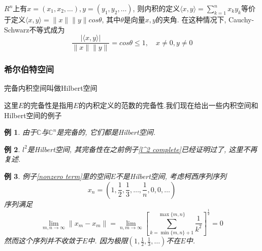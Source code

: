 \documentclass[a4paper,11pt]{article}
\theoremstyle{mystyle}
\newtheorem{example}{\hspace{2em}例}[section]
\begin{document}
$R^n$上有$x=(x_1,x_2,\dots),y=(y_1,y_2,\dots)$, 则内积的定义$\langle x,y\rangle=\sum_{k=1}^{n}x_ky_k$等价于定义$\langle x,y\rangle=\|x\|\|y\|cos\theta$, 其中$\theta$是向量$x,y$的夹角. 在这种情况下, Cauchy-Schwarz不等式成为
\begin{equation*}
  \frac{|\langle x,y\rangle|}{\|x\|\|y\|}=cos\theta\leq 1,\quad x\neq0,y\neq0
\end{equation*}
\subsubsection*{希尔伯特空间}
\begin{definition}
  完备内积空间叫做Hilbert空间
\end{definition}
这里$E$的完备性是指用$E$的内积定义的范数的完备性.我们现在给出一些内积空间和Hilbert空间的例子
\begin{example}
  由于$\mathbb{C}$与$\mathbb{C}^n$是完备的, 它们都是Hilbert空间.
\end{example}
\begin{example}
  $l^2$是Hilbert空间, 其完备性在之前例子\ref{l^2 complete}已经证明过了, 这里不再复述.
\end{example}
\begin{example}
  例子\ref{nonzero term}里的空间$E$不是Hilbert空间, 考虑柯西序列序列
  \begin{equation*}
    x_n=(1,\frac{1}{2},\frac{1}{3},\dots,\frac{1}{n},0,0,\dots)
  \end{equation*}
  序列满足
  \begin{equation*}
    \lim_{m,n\to\infty}\|x_m-x_m\|=\lim_{n,m\to\infty}\left[\sum_{k=\min{\{m,n\}+1}}^{\max\{m,n\}}\frac{1}{k^2}\right]^{\frac{1}{2}}=0
  \end{equation*}
  然而这个序列并不收敛于$E$中. 因为极限$(1,\frac{1}{2},\frac{1}{3},\dots)$不在$E$中.
\end{example}
\end{document}
